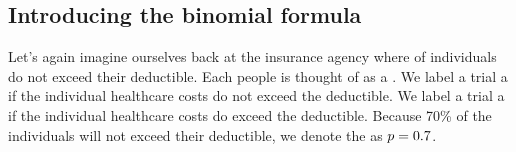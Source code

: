 \subsection{Introducing the binomial formula}

\newcommand{\insureS}{\resp{not}}
\newcommand{\insureF}{\resp{exceed}}
\newcommand{\insureBinomCinDSingleScenario}{0.103}
\newcommand{\insureBinomCinD}{0.412}
\newcommand{\insureBinomEinHSingleScenario}{0.00454}
\newcommand{\insureBinomEinH}{0.254}
\newcommand{\insureBinomFourtyExpValue}{28}
\newcommand{\insureBinomFourtySD}{2.9}
\newcommand{\insureBinomFourtyLower}{22}
\newcommand{\insureBinomFourtyUpper}{34}




Let's again imagine ourselves back at the insurance agency
where \insureSperc{} of individuals do not exceed their
deductible.  Each people is thought of as a .
We label a trial a  if the individual healthcare costs
do not exceed the deductible.
We label a trial a  if the individual healthcare costs do exceed the
deductible.
Because 70\% of the individuals will not exceed their deductible,
we denote the  as
$p = 0.7{}$.


